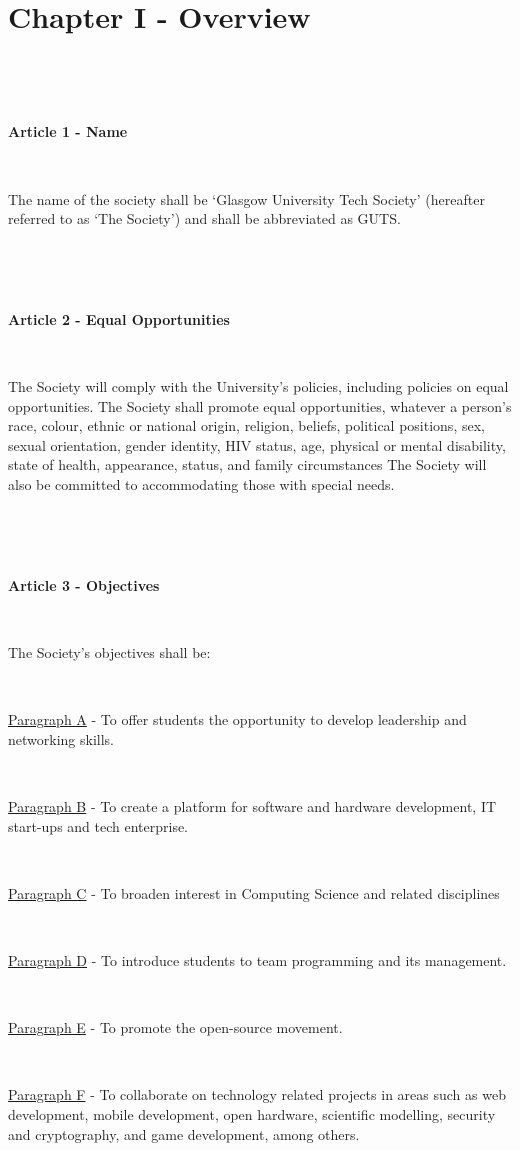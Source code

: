 \section{Chapter I - Overview}

~

~

\large{\textbf{Article 1 - Name}}

~

The name of the society shall be `Glasgow University Tech Society'
(hereafter referred to as `The Society') and shall be abbreviated as
GUTS.

~

~

\large{\textbf{Article 2 - Equal Opportunities}}

~

The Society will comply with the University's policies, including
policies on equal opportunities.
The Society shall promote equal opportunities, whatever a person's race, colour, ethnic or national origin, religion, beliefs, political positions, sex, sexual orientation, gender identity, HIV status, age, physical or mental disability, state of health, appearance, status, and family circumstances 
The Society will also be committed to accommodating those with special
needs.

~

~

\large{\textbf{Article 3 - Objectives}}

~

The Society's objectives shall be:

~

\underline{Paragraph A} - To offer students the opportunity to develop
leadership and networking skills.

~

\underline{Paragraph B} - To create a platform for software and hardware
development, IT start-ups and tech enterprise.

~

\underline{Paragraph C} - To broaden interest in Computing Science and
related disciplines

~

\underline{Paragraph D} - To introduce students to team programming and
its management.

~

\underline{Paragraph E} - To promote the open-source movement.

~

\underline{Paragraph F} - To collaborate on technology related projects
in areas such as web development, mobile development, open hardware,
scientific modelling, security and cryptography, and game development,
among others.

